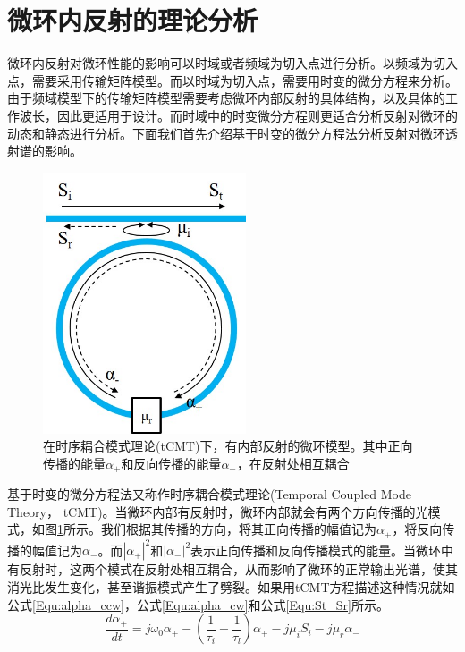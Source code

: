 \section{微环内反射的理论分析}
微环内反射对微环性能的影响可以时域或者频域为切入点进行分析。以频域为切入点，需要采用传输矩阵模型\cite{yariv2006photonics}。而以时域为切入点，需要用时变的微分方程来分析\cite{haus1984waves}。由于频域模型下的传输矩阵模型需要考虑微环内部反射的具体结构，以及具体的工作波长，因此更适用于设计。而时域中的时变微分方程则更适合分析反射对微环的动态和静态进行分析。下面我们首先介绍基于时变的微分方程法分析反射对微环透射谱的影响\cite{haus1984waves,Li2016design,little1997microring}。
\begin{figure}[htb]
	\centering
	\includegraphics[width=6cm]{./Pictures/chapt5_ring_reflector_structure.jpg}
	\caption{在时序耦合模式理论(tCMT)下，有内部反射的微环模型。其中正向传播的能量$\alpha_+$和反向传播的能量$\alpha_-$，在反射处相互耦合}
	\label{chapt5_ring_reflector_structure}
\end{figure}
基于时变的微分方程法又称作时序耦合模式理论(Temporal Coupled Mode Theory， tCMT)。当微环内部有反射时，微环内部就会有两个方向传播的光模式，如图\ref{chapt5_ring_reflector_structure}所示。我们根据其传播的方向，将其正向传播的幅值记为$\alpha_+$，将反向传播的幅值记为$\alpha_-$。而$|\alpha_+|^2$和$|\alpha_-|^2$表示正向传播和反向传播模式的能量。当微环中有反射时，这两个模式在反射处相互耦合，从而影响了微环的正常输出光谱，使其消光比发生变化，甚至谐振模式产生了劈裂。如果用tCMT方程描述这种情况就如公式\ref{Equ:alpha_ccw}，公式\ref{Equ:alpha_cw}和公式\ref{Equ:St_Sr}所示\cite{Li2016design}。
\begin{equation}
\label{Equ:alpha_ccw}
\frac{d\alpha_+}{dt}=j\omega_0\alpha_+-\left(\frac{1}{\tau_i}+\frac{1}{\tau_l}\right)\alpha_+-j\mu_iS_i-j\mu_r\alpha_-
\end{equation}
